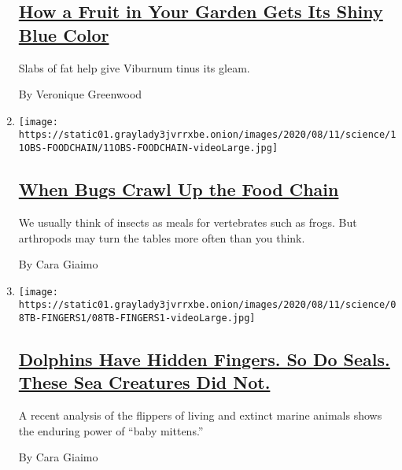 \begin{enumerate}
  \hypertarget{how-a-fruit-in-your-garden-gets-its-shiny-blue-color}{%
  \subsection{\texorpdfstring{\href{/2020/08/11/science/blue-fruits-viburnum.html}{How
  a Fruit in Your Garden Gets Its Shiny Blue
  Color}}{How a Fruit in Your Garden Gets Its Shiny Blue Color}}\label{how-a-fruit-in-your-garden-gets-its-shiny-blue-color}}

  Slabs of fat help give Viburnum tinus its gleam.

  By Veronique Greenwood
\item
  \texttt{[image: https://static01.graylady3jvrrxbe.onion/images/2020/08/11/science/11OBS-FOODCHAIN/11OBS-FOODCHAIN-videoLarge.jpg]}

  \hypertarget{when-bugs-crawl-up-the-food-chain}{%
  \subsection{\texorpdfstring{\href{/2020/08/10/science/bugs-food-chain.html}{When
  Bugs Crawl Up the Food
  Chain}}{When Bugs Crawl Up the Food Chain}}\label{when-bugs-crawl-up-the-food-chain}}

  We usually think of insects as meals for vertebrates such as frogs.
  But arthropods may turn the tables more often than you think.

  By Cara Giaimo
\item
  \texttt{[image: https://static01.graylady3jvrrxbe.onion/images/2020/08/11/science/08TB-FINGERS1/08TB-FINGERS1-videoLarge.jpg]}

  \hypertarget{dolphins-have-hidden-fingers-so-do-seals-these-sea-creatures-did-not}{%
  \subsection{\texorpdfstring{\href{/2020/08/08/science/dolphins-fingers-ichthyosaurs.html}{Dolphins
  Have Hidden Fingers. So Do Seals. These Sea Creatures Did
  Not.}}{Dolphins Have Hidden Fingers. So Do Seals. These Sea Creatures Did Not.}}\label{dolphins-have-hidden-fingers-so-do-seals-these-sea-creatures-did-not}}

  A recent analysis of the flippers of living and extinct marine animals
  shows the enduring power of ``baby mittens.''

  By Cara Giaimo
\end{enumerate}

